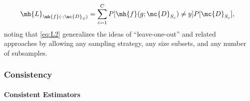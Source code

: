 \begin{align} \label{eq:L2}
	\mh{L}_{\mh{f}(\cdot; \mc{D}_S)} = \sum_{c=1}^C P[\mh{f}(g; \mc{D}_{S_c}) \neq y]  P[\mc{D}_{S_c}],
\end{align}
noting that \eqref{eq:L2} generalizes the ideas of ``leave-one-out'' and related approaches by allowing any sampling strategy, any size subsets, and any number of subsamples.  %

\subsubsection{Consistency}



\paragraph{Consistent Estimators} %
\label{sub:consistent_estimators}

